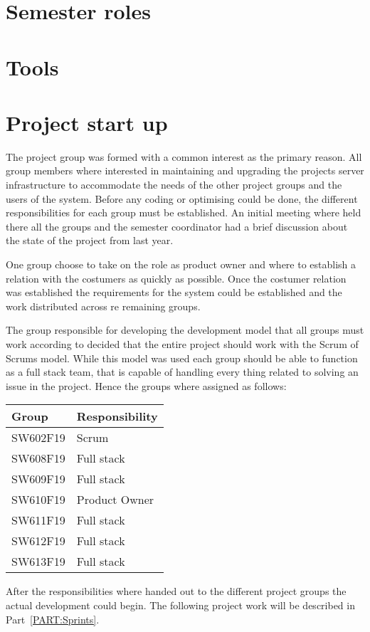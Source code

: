 \section{Semester roles}

\section{Tools}

\section{Project start up}
The project group was formed with a common interest as the primary reason. 
All group members where interested in maintaining and upgrading the projects server infrastructure to accommodate the needs of the other project groups and the users of the system. 
Before any coding or optimising could be done, the different responsibilities for each group must be established. 
An initial meeting where held there all the groups and the semester coordinator had a brief discussion about the state of the project from last year. 

One group choose to take on the role as product owner and where to establish a relation with the costumers as quickly as possible. 
Once the costumer relation was established the requirements for the system could be established and the work distributed across re remaining groups.

The group responsible for developing the development model that all groups must work according to decided that the entire project should work with the Scrum of Scrums model.
While this model was used each group should be able to function as a full stack team, that is capable of handling every thing related to solving an issue in the project.
Hence the groups where assigned as follows:

\begin{table}[H]
\centering
\begin{tabular}{|l|l|}
\hline
\textbf{Group} & \textbf{Responsibility} \\ \hline
SW602F19 & Scrum\\ \hline
SW608F19 & Full stack\\ \hline
SW609F19 & Full stack\\ \hline
SW610F19 & Product Owner  \\ \hline
SW611F19 & Full stack \\ \hline
SW612F19 & Full stack \\ \hline
SW613F19 & Full stack \\ \hline
\end{tabular}
\label{TBL:GroupResponsibility}
\end{table}

After the responsibilities where handed out to the different project groups the actual development could begin.
The following project work will be described in Part~\ref{PART:Sprints}.
